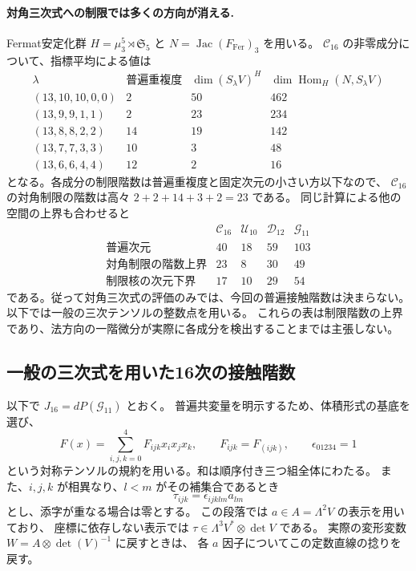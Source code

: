 \documentclass[a4paper,11pt]{ltjsarticle}
\theoremstyle{definition}
\begin{document}
\paragraph{対角三次式への制限では多くの方向が消える.}
Fermat安定化群 $H=\mu_3^5\rtimes\mathfrak S_5$ と
$N=\operatorname{Jac}(F_{\mathrm{Fer}})_3$ を用いる。
$\mathcal C_{16}$ の非零成分について、指標平均による値は
\[
\begin{array}{c|r|r|r}
 \lambda&\text{普遍重複度}&\dim(S_\lambda V)^H
         &\dim\operatorname{Hom}_H(N,S_\lambda V)\\\hline
 (13,10,10,0,0)&2&50&462\\
 (13,9,9,1,1)&2&23&234\\
 (13,8,8,2,2)&14&19&142\\
 (13,7,7,3,3)&10&3&48\\
 (13,6,6,4,4)&12&2&16
\end{array}
\]
となる。各成分の制限階数は普遍重複度と固定次元の小さい方以下なので、
$\mathcal C_{16}$ の対角制限の階数は高々 $2+2+14+3+2=23$ である。
同じ計算による他の空間の上界も合わせると
\[
\begin{array}{c|rrrr}
 &\mathcal C_{16}&\mathcal U_{10}&\mathcal D_{12}&\mathcal G_{11}\\\hline
 \text{普遍次元}&40&18&59&103\\
 \text{対角制限の階数上界}&23&8&30&49\\
 \text{制限核の次元下界}&17&10&29&54
\end{array}
\]
である。従って対角三次式の評価のみでは、今回の普遍接触階数は決まらない。
以下では一般の三次テンソルの整数点を用いる。
これらの表は制限階数の上界であり、法方向の一階微分が実際に各成分を検出することまでは主張しない。

\subsection{一般の三次式を用いた16次の接触階数}
\label{subsec:v13-sixteenth-tensor-rank}

以下で $J_{16}=dP(\mathcal G_{11})$ とおく。
普遍共変量を明示するため、体積形式の基底を選び、
\[
 F(x)=\sum_{i,j,k=0}^4 F_{ijk}x_ix_jx_k,\qquad F_{ijk}=F_{(ijk)},
 \qquad \epsilon_{01234}=1
\]
という対称テンソルの規約を用いる。和は順序付き三つ組全体にわたる。
また、$i,j,k$ が相異なり、$l<m$ がその補集合であるとき
\[
 \tau_{ijk}=\epsilon_{ijklm}a_{lm}
\]
とし、添字が重なる場合は零とする。
この段落では $a\in A=\Lambda^2V$ の表示を用いており、
座標に依存しない表示では
$\tau\in\Lambda^3V^*\otimes\det V$ である。
実際の変形変数 $W=A\otimes\det(V)^{-1}$ に戻すときは、
各 $a$ 因子についてこの定数直線の捻りを戻す。
\end{document}
